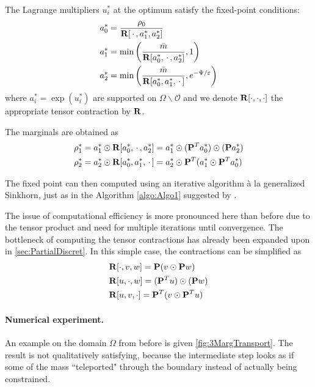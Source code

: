 \documentclass[../report.tex]{subfiles}
\begin{document}
\begin{prop}
The Lagrange multipliers $u_i^*$ at the optimum satisfy the fixed-point conditions:
\begin{align*}
	&a_0^* = \frac{\rho_0}{\mathbf{R}[\,\cdot\,, a_1^*, a_2^*]} \\
	&a_1^* = \min\left(
	\frac{\bar{m}}{\mathbf{R}[a_0^*, \,\cdot\,, a_2^*]}, 1\right) \\
	&a_2^* = \min\left(
	\frac{\bar{m}}{\mathbf{R}[a_0^*, a_1^*, \,\cdot\,]}, e^{-\Psi/\varepsilon}
	\right)
\end{align*}
where $a_i^* = \exp(u_i^*)$ are supported on $\Omega\backslash\mathscr{O}$ and we denote $\mathbf{R}[\cdot,\cdot,\cdot]$ the appropriate tensor contraction by $\mathbf{R}$.

The marginals are obtained as
\[
\begin{aligned}
	\rho_1^* &=
	a_1^* \odot
	\mathbf{R}[a_0^*, \,\cdot\,, a_2^*] =
	a_1^* \odot
	(\mathbf{P}^Ta_0^*) \odot
	(\mathbf{P}a_2^*) \\
	\rho_2^* &= 
	a_2^* \odot \mathbf{R}[a_0^*, a_1^*, \,\cdot\,]
	= a_2^* \odot
	\mathbf{P}^T
	(a_1^* \odot \mathbf{P}^Ta_0^*)
\end{aligned}
\]
\end{prop}



The fixed point can then computed using an iterative algorithm à la generalized Sinkhorn, just as in the Algorithm \autoref{algo:Algo1} suggested by \cite{benamou2018entropy}.

The issue of computational efficiency is more pronounced here than before due to the tensor product and need for multiple iterations until convergence. The bottleneck of computing the tensor contractions has already been expanded upon in \cref{sec:PartialDiscret}. In this simple case, the contractions can be simplified as
\[
	\begin{aligned}
	&\mathbf{R}[\cdot,v,w] = 
	\mathbf{P} (v \odot \mathbf{P}w) \\
	&\mathbf{R}[u,\cdot,w]
	= (\mathbf{P}^Tu) \odot (\mathbf{P}w)  \\
	&\mathbf{R}[u, v, \cdot] = 
	\mathbf{P}^T (v \odot \mathbf{P}^T u)
	\end{aligned}
\]

\paragraph{Numerical experiment.} An example on the domain $\Omega$ from before is given \cref{fig:3MargTransport}. The result is not qualitatively satisfying, because the intermediate step looks as if some of the mass ``teleported" through the boundary instead of actually being constrained.
\end{document}
